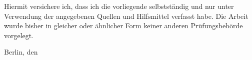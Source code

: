 
Hiermit versichere ich, dass ich die vorliegende \thethesistyp{} selbstständig und nur unter
Verwendung der angegebenen Quellen und Hilfsmittel verfasst habe. Die Arbeit wurde bisher
in gleicher oder ähnlicher Form keiner anderen Prüfungsbehörde vorgelegt.

\vskip 1cm

Berlin, den \thedatum

\vskip 1.5cm

\theautor